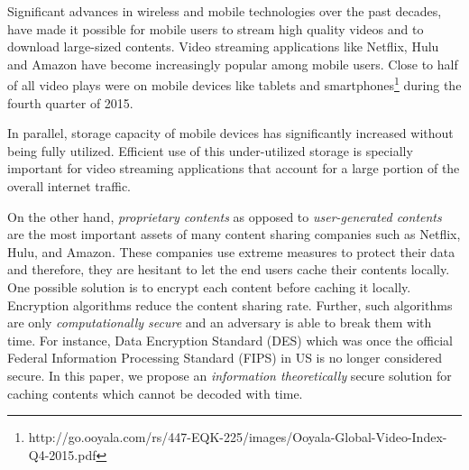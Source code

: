 \documentclass[10pt,journal]{IEEEtran}
\begin{document}
Significant advances in wireless and mobile technologies over the past decades, have made it possible for mobile users to stream high quality videos and to download large-sized contents. Video streaming applications like Netflix, Hulu and Amazon have become increasingly popular among mobile users. Close to half of all video plays were on mobile devices like tablets and smartphones\footnote{http://go.ooyala.com/rs/447-EQK-225/images/Ooyala-Global-Video-Index-Q4-2015.pdf} during the fourth quarter of 2015. 

In parallel, storage capacity of mobile devices has significantly increased without being fully utilized. %
Efficient use of this under-utilized storage  is specially important for video streaming applications that account for a large portion of the overall internet traffic.

On the other hand, {\em proprietary contents} as opposed to {\em user-generated contents} are the most important assets of many content sharing companies such as Netflix, Hulu, and Amazon. These companies use extreme measures to protect their data and therefore, they are hesitant to let the end users cache their contents locally. One possible solution is to encrypt each content before caching it locally. Encryption algorithms {reduce} the content sharing rate. Further, such algorithms are only {\em computationally secure} and an adversary is able to break them with time. For instance, Data Encryption Standard (DES) which was once the official Federal Information Processing Standard (FIPS) in US is no longer considered secure. In this paper, we  propose an {\em information theoretically} secure solution for caching contents which cannot be decoded with time. %


\end{document}
